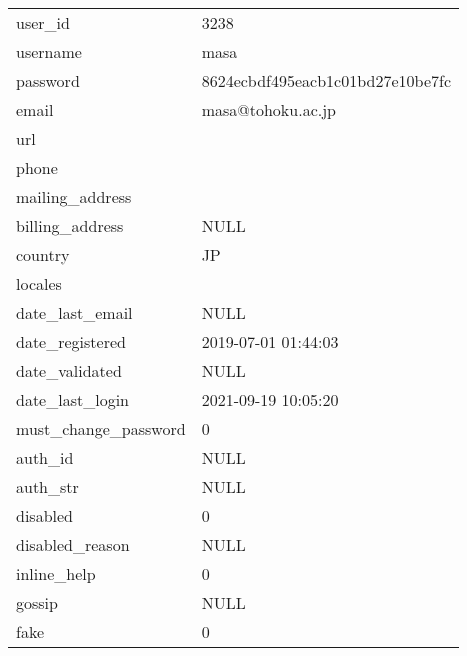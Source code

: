 \begin{longtable}{|l|l|}
    \hline
    user\_id & 3238 \\
    username & masa \\
    password & 8624ecbdf495eacb1c01bd27e10be7fc \\
    email & masa@tohoku.ac.jp \\
    url &  \\
    phone &  \\
    mailing\_address &  \\
    billing\_address & NULL \\
    country & JP \\
    locales &  \\
    date\_last\_email & NULL \\
    date\_registered & 2019-07-01 01:44:03 \\
    date\_validated & NULL \\
    date\_last\_login & 2021-09-19 10:05:20 \\
    must\_change\_password & 0 \\
    auth\_id & NULL \\
    auth\_str & NULL \\
    disabled & 0 \\
    disabled\_reason & NULL \\
    inline\_help & 0 \\
    gossip & NULL \\
    fake & 0 \\



\end{longtable}
